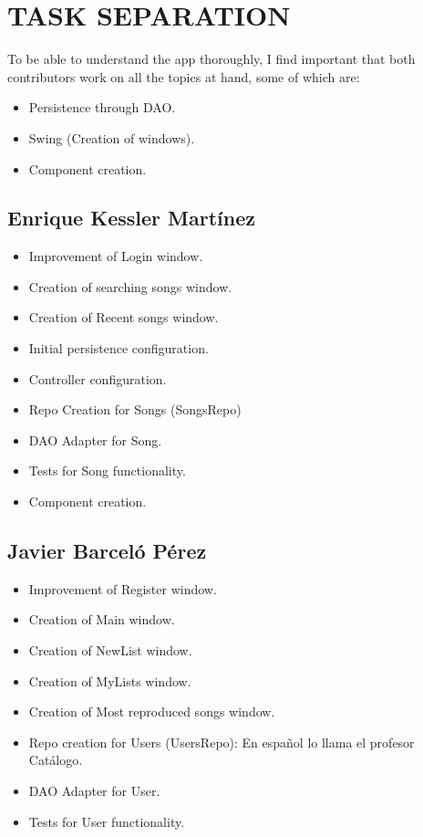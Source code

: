 \documentclass[11pt]{article}
\author{Enrique Kessler Martínez}
\date{\today}
\title{}
\begin{document}
\tableofcontents

\section{TASK SEPARATION}
\label{sec:org10ac16d}
To be able to understand the app thoroughly, I find important that both contributors work
on all the topics at hand, some of which are:
\begin{itemize}
\item Persistence through DAO.
\item Swing (Creation of windows).
\item Component creation.
\end{itemize}
\subsection{Enrique Kessler Martínez}
\label{sec:org2e22166}
\begin{itemize}
\item Improvement of Login window.
\item Creation of searching songs window.
\item Creation of Recent songs window.
\item Initial persistence configuration.
\item Controller configuration.
\item Repo Creation for Songs (SongsRepo)
\item DAO Adapter for Song.
\item Tests for Song functionality.
\item Component creation.
\end{itemize}
\subsection{Javier Barceló Pérez}
\label{sec:org3251598}
\begin{itemize}
\item Improvement of Register window.
\item Creation of Main window.
\item Creation of NewList window.
\item Creation of MyLists window.
\item Creation of Most reproduced songs window.
\item Repo creation for Users (UsersRepo): En español lo llama el profesor Catálogo.
\item DAO Adapter for User.
\item Tests for User functionality.
\end{itemize}
\end{document}
